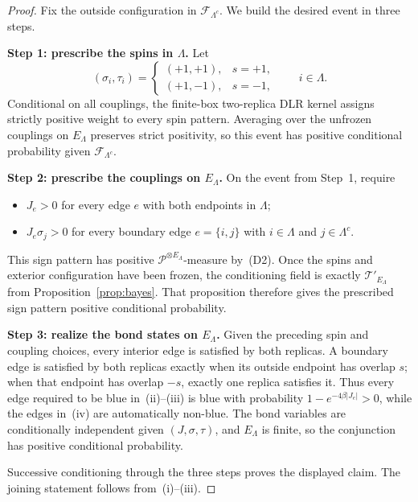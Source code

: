 \documentclass[11pt]{article}
\numberwithin{theorem}{section}
\theoremstyle{remark}
\begin{document}
\begin{proof}
Fix the outside configuration in $\mathscr{F}_{\Lambda^c}$.
We build the desired event in three steps.

\medskip\noindent
\textbf{Step 1: prescribe the spins in $\Lambda$.}
Let
\[
  (\sigma_i,\tau_i)=
  \begin{cases}
    (+1,+1),&s=+1,\\
    (+1,-1),&s=-1,
  \end{cases}
  \qquad i\in\Lambda.
\]
Conditional on all couplings, the finite-box two-replica DLR kernel assigns strictly positive weight to every spin pattern.
Averaging over the unfrozen couplings on $E_\Lambda$ preserves strict positivity, so this event has positive conditional probability given $\mathscr{F}_{\Lambda^c}$.

\medskip\noindent
\textbf{Step 2: prescribe the couplings on $E_\Lambda$.}
On the event from Step~1, require
\begin{itemize}
\item $J_e>0$ for every edge $e$ with both endpoints in $\Lambda$;
\item $J_e\sigma_j>0$ for every boundary edge $e=\{i,j\}$ with $i\in\Lambda$ and $j\in\Lambda^c$.
\end{itemize}
This sign pattern has positive $\mathscr{P}^{\otimes E_\Lambda}$-measure by~\textup{(D2)}.
Once the spins and exterior configuration have been frozen, the conditioning field is exactly $\mathcal{T}'_{E_\Lambda}$ from Proposition~\ref{prop:bayes}.
That proposition therefore gives the prescribed sign pattern positive conditional probability.

\medskip\noindent
\textbf{Step 3: realize the bond states on $E_\Lambda$.}
Given the preceding spin and coupling choices, every interior edge is satisfied by both replicas.
A boundary edge is satisfied by both replicas exactly when its outside endpoint has overlap $s$; when that endpoint has overlap $-s$, exactly one replica satisfies it.
Thus every edge required to be blue in~\textup{(ii)}--\textup{(iii)} is blue with probability
$1-e^{-4\beta|J_e|}>0$, while the edges in~\textup{(iv)} are automatically non-blue.
The bond variables are conditionally independent given $(J,\sigma,\tau)$, and $E_\Lambda$ is finite, so the conjunction has positive conditional probability.

Successive conditioning through the three steps proves the displayed claim.
The joining statement follows from~\textup{(i)}--\textup{(iii)}.
\end{proof}
\end{document}
